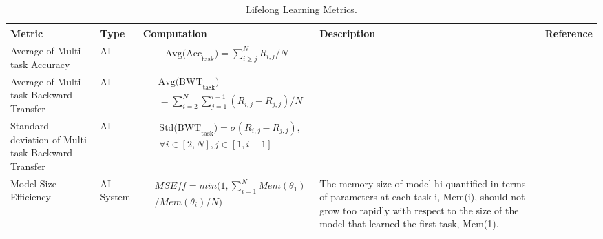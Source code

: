 \begin{table}[h!]
\caption{Lifelong Learning Metrics.} 
\label{tab:ll}
\begin{tabular}{|p{2cm}|l|p{6cm}|p{3cm}|p{1.5cm}|}

\hline
Metric                 & Type      & Computation & Description                                                                & Reference 
\\ \hline

Average of Multi-task Accuracy
& AI 
& 
\parbox{3cm}{
    \begin{equation} \label{equ:aoma} 
    \begin{split}
\text{Avg(Acc}_\text{task}) = \sum^N_{i \geq j} R_{i,j} / N
    \end{split} 
    \end{equation} 
}
& 
& \cite{DBLP:journals/corr/abs-1810-13166,DBLP:conf/nips/Lopez-PazR17}       
\\ \hline

Average of Multi-task Backward Transfer
& AI 
& 
\parbox{3cm}{
    \begin{equation} \label{equ:aombt} 
    \begin{split}
& \text{Avg(BWT}_\text{task}) \\
& = \sum^{N}_{i=2}\sum^{i-1}_{j=1} (R_{i,j}-R_{j,j}) / N
    \end{split} 
    \end{equation} 
}
&  
& \cite{DBLP:journals/corr/abs-1810-13166,DBLP:conf/nips/Lopez-PazR17}       
\\ \hline


Standard deviation of Multi-task Backward Transfer
& AI 
& 
\parbox{3cm}{
    \begin{equation} \label{equ:sdombt} 
    \begin{split}
& \text{Std(BWT}_\text{task}) = \sigma(R_{i,j}-R_{j,j}), \\ 
& \forall i \in [2, N], j \in [1, i-1]
    \end{split} 
    \end{equation} 
}
&  
& \cite{DBLP:journals/corr/abs-1810-13166,DBLP:conf/nips/Lopez-PazR17}       
\\ \hline


Model Size Efficiency
& AI System
& 
\parbox{3cm}{
    \begin{equation} \label{equ:mseff} 
    \begin{split}
& MSEff = min(1, \sum_{i=1}^N Mem(\theta_1) \\
& / Mem(\theta_i) / N)
    \end{split} 
    \end{equation} 
}
& The memory size of model hi quantified in terms of parameters at each task i, Mem(i), should not grow too rapidly with respect to the size of the model that learned the first task, Mem(1). 
& \cite{DBLP:journals/corr/abs-1810-13166,DBLP:conf/nips/Lopez-PazR17}       
\\ \hline


\end{tabular}
\end{table}
